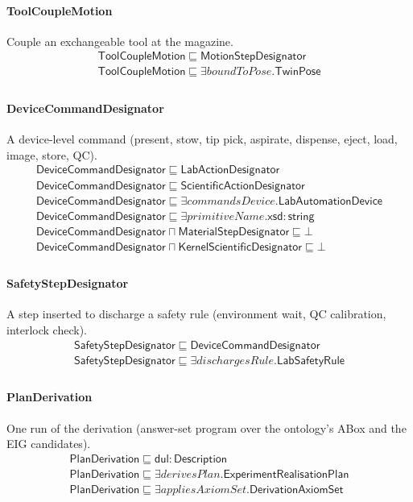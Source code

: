 \documentclass[10pt]{article}
\begin{document}
\paragraph{ToolCoupleMotion} Couple an exchangeable tool at the magazine.
\[\begin{array}{l}
\mathsf{ToolCoupleMotion} \sqsubseteq  \mathsf{MotionStepDesignator} \\
\mathsf{ToolCoupleMotion} \sqsubseteq  \exists \mathit{boundToPose}.\mathsf{TwinPose} \\
\end{array}\]
\paragraph{DeviceCommandDesignator} A device-level command (present, stow, tip pick, aspirate, dispense, eject, load, image, store, QC).
\[\begin{array}{l}
\mathsf{DeviceCommandDesignator} \sqsubseteq  \mathsf{LabActionDesignator} \\
\mathsf{DeviceCommandDesignator} \sqsubseteq  \mathsf{ScientificActionDesignator} \\
\mathsf{DeviceCommandDesignator} \sqsubseteq  \exists \mathit{commandsDevice}.\mathsf{LabAutomationDevice} \\
\mathsf{DeviceCommandDesignator} \sqsubseteq  \exists \mathit{primitiveName}.\mathsf{xsd{:}string} \\
\mathsf{DeviceCommandDesignator} \sqcap  \mathsf{MaterialStepDesignator} \sqsubseteq  \bot  \\
\mathsf{DeviceCommandDesignator} \sqcap  \mathsf{KernelScientificDesignator} \sqsubseteq  \bot  \\
\end{array}\]
\paragraph{SafetyStepDesignator} A step inserted to discharge a safety rule (environment wait, QC calibration, interlock check).
\[\begin{array}{l}
\mathsf{SafetyStepDesignator} \sqsubseteq  \mathsf{DeviceCommandDesignator} \\
\mathsf{SafetyStepDesignator} \sqsubseteq  \exists \mathit{dischargesRule}.\mathsf{LabSafetyRule} \\
\end{array}\]
\paragraph{PlanDerivation} One run of the derivation (answer-set program over the ontology's ABox and the EIG candidates).
\[\begin{array}{l}
\mathsf{PlanDerivation} \sqsubseteq  \mathsf{dul{:}Description} \\
\mathsf{PlanDerivation} \sqsubseteq  \exists \mathit{derivesPlan}.\mathsf{ExperimentRealisationPlan} \\
\mathsf{PlanDerivation} \sqsubseteq  \exists \mathit{appliesAxiomSet}.\mathsf{DerivationAxiomSet} \\
\end{array}\]
\end{document}
